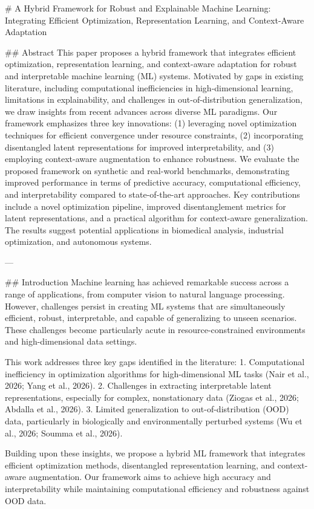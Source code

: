 # A Hybrid Framework for Robust and Explainable Machine Learning: Integrating Efficient Optimization, Representation Learning, and Context-Aware Adaptation

## Abstract
This paper proposes a hybrid framework that integrates efficient optimization, representation learning, and context-aware adaptation for robust and interpretable machine learning (ML) systems. Motivated by gaps in existing literature, including computational inefficiencies in high-dimensional learning, limitations in explainability, and challenges in out-of-distribution generalization, we draw insights from recent advances across diverse ML paradigms. Our framework emphasizes three key innovations: (1) leveraging novel optimization techniques for efficient convergence under resource constraints, (2) incorporating disentangled latent representations for improved interpretability, and (3) employing context-aware augmentation to enhance robustness. We evaluate the proposed framework on synthetic and real-world benchmarks, demonstrating improved performance in terms of predictive accuracy, computational efficiency, and interpretability compared to state-of-the-art approaches. Key contributions include a novel optimization pipeline, improved disentanglement metrics for latent representations, and a practical algorithm for context-aware generalization. The results suggest potential applications in biomedical analysis, industrial optimization, and autonomous systems.

---

## Introduction
Machine learning has achieved remarkable success across a range of applications, from computer vision to natural language processing. However, challenges persist in creating ML systems that are simultaneously efficient, robust, interpretable, and capable of generalizing to unseen scenarios. These challenges become particularly acute in resource-constrained environments and high-dimensional data settings.

This work addresses three key gaps identified in the literature:
1. Computational inefficiency in optimization algorithms for high-dimensional ML tasks (Nair et al., 2026; Yang et al., 2026).
2. Challenges in extracting interpretable latent representations, especially for complex, nonstationary data (Ziogas et al., 2026; Abdalla et al., 2026).
3. Limited generalization to out-of-distribution (OOD) data, particularly in biologically and environmentally perturbed systems (Wu et al., 2026; Soumma et al., 2026).

Building upon these insights, we propose a hybrid ML framework that integrates efficient optimization methods, disentangled representation learning, and context-aware augmentation. Our framework aims to achieve high accuracy and interpretability while maintaining computational efficiency and robustness against OOD data.


